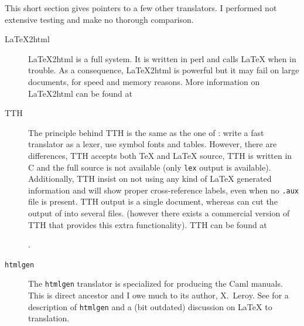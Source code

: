 This short section gives pointers to a few other translators. I
performed not extensive testing and make no thorough comparison.
\begin{description}
\item[LaTeX2html]
LaTeX2html is a full system. It is written in perl and
calls \LaTeX{} when in trouble.
As a consequence, LaTeX2html is powerful but it may fail on
large documents, for speed and memory reasons.
More information on LaTeX2html can be found at
\begin{center}
\end{center}

\item[TTH] The principle behind TTH is the same as the one of
\hevea{}: write a fast translator as a lexer, use symbol fonts and
tables. However, there are differences, TTH accepts both \TeX{} and
\LaTeX{} source, 
TTH is written in C and the full source is not available
(only \verb+lex+ output is available).
Additionally, TTH  insist on not using any kind of \LaTeX{}
generated information and will show proper cross-reference labels,
even when no \texttt{.aux} file is present.
TTH output is a single document,
whereas \hacha{} can cut the output of \hevea{} into several files.
(however there exists a commercial
version of TTH that provides this extra functionality).
TTH can be found at
\begin{center}
.
\end{center}

\item[\texttt{htmlgen}] The \texttt{htmlgen} translator is specialized
for producing the Caml manuals. This is \hevea{} direct ancestor and I
owe much to its author, X.~Leroy. See \cite{htmlgen} for a description
of \texttt{htmlgen} and a (bit outdated) discussion on \LaTeX{} to
\html{} translation.
\end{description}

